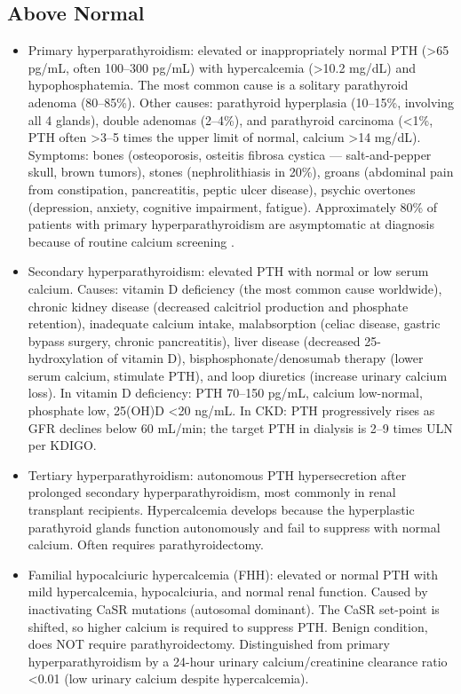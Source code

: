 \subsection*{Above Normal}
\begin{itemize}
  \item Primary hyperparathyroidism: elevated or inappropriately normal PTH (>65 pg/mL, often 100--300 pg/mL) with hypercalcemia (>10.2 mg/dL) and hypophosphatemia. The most common cause is a solitary parathyroid adenoma (80--85\%). Other causes: parathyroid hyperplasia (10--15\%, involving all 4 glands), double adenomas (2--4\%), and parathyroid carcinoma (<1\%, PTH often >3--5 times the upper limit of normal, calcium >14 mg/dL). Symptoms: bones (osteoporosis, osteitis fibrosa cystica --- salt-and-pepper skull, brown tumors), stones (nephrolithiasis in 20\%), groans (abdominal pain from constipation, pancreatitis, peptic ulcer disease), psychic overtones (depression, anxiety, cognitive impairment, fatigue). Approximately 80\% of patients with primary hyperparathyroidism are asymptomatic at diagnosis because of routine calcium screening \cite{walker2018primary}.
  \item Secondary hyperparathyroidism: elevated PTH with normal or low serum calcium. Causes: vitamin D deficiency (the most common cause worldwide), chronic kidney disease (decreased calcitriol production and phosphate retention), inadequate calcium intake, malabsorption (celiac disease, gastric bypass surgery, chronic pancreatitis), liver disease (decreased 25-hydroxylation of vitamin D), bisphosphonate/denosumab therapy (lower serum calcium, stimulate PTH), and loop diuretics (increase urinary calcium loss). In vitamin D deficiency: PTH 70--150 pg/mL, calcium low-normal, phosphate low, 25(OH)D <20 ng/mL. In CKD: PTH progressively rises as GFR declines below 60 mL/min; the target PTH in dialysis is 2--9 times ULN per KDIGO.
  \item Tertiary hyperparathyroidism: autonomous PTH hypersecretion after prolonged secondary hyperparathyroidism, most commonly in renal transplant recipients. Hypercalcemia develops because the hyperplastic parathyroid glands function autonomously and fail to suppress with normal calcium. Often requires parathyroidectomy.
  \item Familial hypocalciuric hypercalcemia (FHH): elevated or normal PTH with mild hypercalcemia, hypocalciuria, and normal renal function. Caused by inactivating CaSR mutations (autosomal dominant). The CaSR set-point is shifted, so higher calcium is required to suppress PTH. Benign condition, does NOT require parathyroidectomy. Distinguished from primary hyperparathyroidism by a 24-hour urinary calcium/creatinine clearance ratio <0.01 (low urinary calcium despite hypercalcemia).

\end{itemize}
